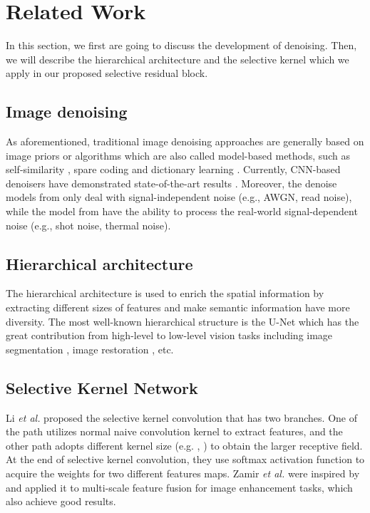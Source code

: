 \documentclass{article}
\begin{document}
\section{Related Work}
In this section, we first are going to discuss the development of denoising. Then, we will describe the hierarchical architecture and the selective kernel which we apply in our proposed selective residual block.

\subsection{Image denoising} As aforementioned, traditional image denoising approaches are generally based on image priors or algorithms which are also called model-based methods, such as self-similarity \cite{01,02,21}, spare coding \cite{22,23} and dictionary learning \cite{22,25}. Currently, CNN-based denoisers have demonstrated state-of-the-art results \cite{03,04,13,14,15}. Moreover, the denoise models from \cite{04,11,14,15,16,17,44} only deal with signal-independent noise (e.g., AWGN, read noise), while the model from \cite{12,26,27,28,29} have the ability to process the real-world signal-dependent noise (e.g., shot noise, thermal noise).

\subsection{Hierarchical architecture} The hierarchical architecture is used to enrich the spatial information by extracting different sizes of features and make semantic information have more diversity. The most well-known hierarchical structure is the U-Net \cite{13} which has the great contribution from high-level to low-level vision tasks including image segmentation \cite{31,32}, image restoration \cite{14,15,30}, etc.

\subsection{Selective Kernel Network} Li \textit{et al.} proposed the selective kernel convolution that has two branches. One of the path utilizes normal naive  convolution kernel to extract features, and the other path adopts different kernel size (e.g. , ) to obtain the larger receptive field. At the end of selective kernel convolution, they use softmax activation function to acquire the weights for two different features maps. Zamir \textit{et al.} \cite{20} were inspired by \cite{19} and applied it to multi-scale feature fusion for image enhancement tasks, which also achieve good results.
\end{document}
